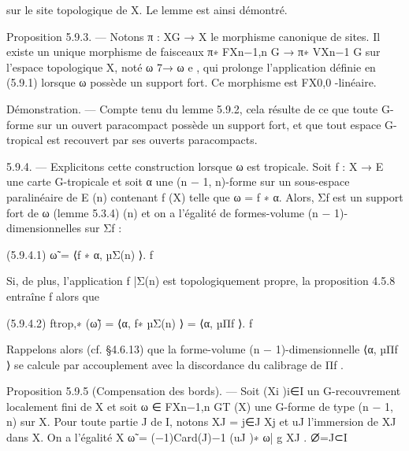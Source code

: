 \documentclass[
  10pt,
]{article}
\newenvironment{Shaded}{}{}
\newcommand{\NormalTok}[1]{#1}
\begin{document}
\begin{Shaded}
\begin{Highlighting}[]
\NormalTok{sur le site topologique de X. Le lemme est ainsi démontré.}


\NormalTok{Proposition 5.9.3. — Notons π : XG → X le morphisme canonique de sites. Il existe}
\NormalTok{un unique morphisme de faisceaux π∗ FXn−1,n}
\NormalTok{                                          G}
\NormalTok{                                              → π∗ VXn−1}
\NormalTok{                                                       G}
\NormalTok{                                                          sur l’espace topologique X, noté}
\NormalTok{ω 7→ ω}
\NormalTok{     e , qui prolonge l’application définie en (5.9.1) lorsque ω possède un support fort.}
\NormalTok{Ce morphisme est FX0,0 {-}linéaire.}

\NormalTok{Démonstration. — Compte tenu du lemme 5.9.2, cela résulte de ce que toute G{-}forme}
\NormalTok{sur un ouvert paracompact possède un support fort, et que tout espace G{-}tropical est}
\NormalTok{recouvert par ses ouverts paracompacts.}

\NormalTok{5.9.4. — Explicitons cette construction lorsque ω est tropicale. Soit f : X → E une}
\NormalTok{carte G{-}tropicale et soit α une (n − 1, n){-}forme sur un sous{-}espace paralinéaire de E}
\NormalTok{                                             (n)}
\NormalTok{contenant f (X) telle que ω = f ∗ α. Alors, Σf est un support fort de ω (lemme 5.3.4)}
\NormalTok{                                                                             (n)}
\NormalTok{et on a l’égalité de formes{-}volume (n − 1){-}dimensionnelles sur Σf                  :}

\NormalTok{(5.9.4.1)                                 ω̃ = ⟨f ∗ α, µΣ(n) ⟩.}
\NormalTok{                                                            f}


\NormalTok{Si, de plus, l’application f |Σ(n) est topologiquement propre, la proposition 4.5.8 entraîne}
\NormalTok{                               f}
\NormalTok{alors que}

\NormalTok{(5.9.4.2)                       ftrop,∗ (ω̃) = ⟨α, f∗ µΣ(n) ⟩ = ⟨α, µΠf ⟩.}
\NormalTok{                                                        f}


\NormalTok{Rappelons alors (cf. §4.6.13) que la forme{-}volume (n − 1){-}dimensionnelle ⟨α, µΠf ⟩ se}
\NormalTok{calcule par accouplement avec la discordance du calibrage de Πf .}

\NormalTok{Proposition 5.9.5 (Compensation des bords). — Soit (Xi )i∈I un G{-}recouvrement}
\NormalTok{localement fini de X et soit ω ∈ FXn−1,n}
\NormalTok{                                     GT}
\NormalTok{                                         (X) une G{-}forme de type (n − 1, n) sur X.}
\NormalTok{Pour toute partie J de I, notons XJ = j∈J Xj et uJ l’immersion de XJ dans X. On a}
\NormalTok{l’égalité}
\NormalTok{                                X}
\NormalTok{                           ω̃ =     (−1)Card(J)−1 (uJ )∗ ω|}
\NormalTok{                                                         g XJ .}
\NormalTok{                                      ∅̸=J⊂I}



\end{Highlighting}
\end{Shaded}
\end{document}
